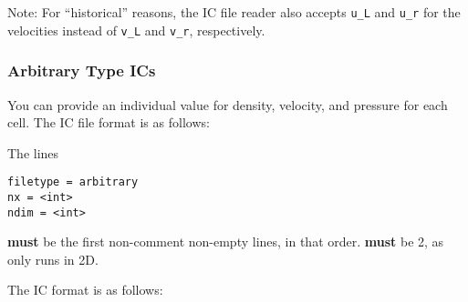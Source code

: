 Note: For ``historical'' reasons, the IC file reader also accepts \texttt{u\_L}
and \texttt{u\_r} for the velocities instead of \texttt{v\_L} and
\texttt{v\_r}, respectively.






\subsubsection{Arbitrary Type ICs}\label{chap:arbitrary-ic}




You can provide an individual value for density, velocity, and pressure for each
cell. The IC file format is as follows:

The lines

\begin{lstlisting}
filetype = arbitrary
nx = <int>
ndim = <int>
\end{lstlisting}

\textbf{must} be the first non-comment non-empty lines, in that order.
 \textbf{must} be 2, as \hydro only runs
in 2D.

The IC format is as follows:

